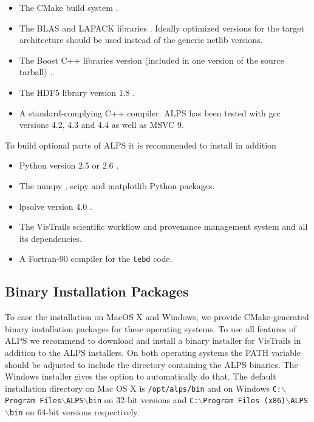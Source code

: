 \documentclass[12pt]{iopart}
\begin{document}
\begin{itemize}
\item The CMake build system \cite{cmake}.
\item The BLAS \cite{blasnetlib} and LAPACK libraries \cite{lapack}. Ideally optimized versions for the target architecture should be used instead of the generic netlib versions.
\item The Boost C++ libraries version (included in one version of the source tarball) \cite{boost}.
\item The HDF5 library version 1.8 \cite{hdf5}.
\item A standard-complying C++ compiler. ALPS has been tested with gcc versions 4.2, 4.3 and 4.4 as well as MSVC 9.
\end{itemize}
To build optional parts of ALPS it is recommended to install in addition
\begin{itemize}
\item Python version 2.5 or 2.6 \cite{python}.
\item The numpy \cite{numpy}, scipy \cite{scipy} and matplotlib \cite{matplotlib} Python packages.
\item lpsolve version 4.0 \cite{lpsolve}.
\item The VisTrails scientific workflow and provenance management system \cite{vistrails} and all its dependencies.
\item A Fortran-90 compiler for the {\tt tebd} code.
\end{itemize}

\subsection{Binary Installation Packages}

To ease the installation on MacOS X and Windows, we provide CMake-generated binary installation packages for these operating systems. To use all features of ALPS we recommend to download and install a binary installer for VisTrails \cite{vistrails} in addition to the ALPS installers. On both operating systems the PATH variable should be adjusted to include the directory containing the ALPS binaries. The Windows installer gives the option to automatically do that. The default installation directory on Mac OS X is {\tt /opt/alps/bin} and on Windows {\tt C:$\backslash$Program Files$\backslash$ALPS$\backslash$bin} on 32-bit versions and  {\tt C:$\backslash$Program Files (x86)$\backslash$ALPS$\backslash$bin} on 64-bit versions respectively.
\end{document}

